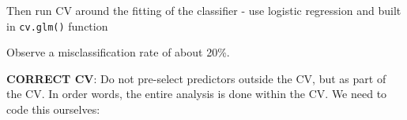 \documentclass[
]{article}
\newenvironment{Shaded}{\begin{snugshade}}{\end{snugshade}}
\newcommand{\AttributeTok}[1]{\textcolor[rgb]{0.13,0.29,0.53}{#1}}
\newcommand{\ControlFlowTok}[1]{\textcolor[rgb]{0.13,0.29,0.53}{\textbf{#1}}}
\newcommand{\DecValTok}[1]{\textcolor[rgb]{0.00,0.00,0.81}{#1}}
\newcommand{\FloatTok}[1]{\textcolor[rgb]{0.00,0.00,0.81}{#1}}
\newcommand{\FunctionTok}[1]{\textcolor[rgb]{0.13,0.29,0.53}{\textbf{#1}}}
\newcommand{\NormalTok}[1]{#1}
\newcommand{\OtherTok}[1]{\textcolor[rgb]{0.56,0.35,0.01}{#1}}
\newcommand{\SpecialCharTok}[1]{\textcolor[rgb]{0.81,0.36,0.00}{\textbf{#1}}}
\newcommand{\StringTok}[1]{\textcolor[rgb]{0.31,0.60,0.02}{#1}}
\begin{document}
Then run CV around the fitting of the classifier - use logistic
regression and built in \texttt{cv.glm()} function

\begin{Shaded}
\end{Shaded}

Observe a misclassification rate of about 20\%.

\textbf{CORRECT CV}: Do not pre-select predictors outside the CV, but as
part of the CV. In order words, the entire analysis is done within the
CV. We need to code this ourselves:
\end{document}
